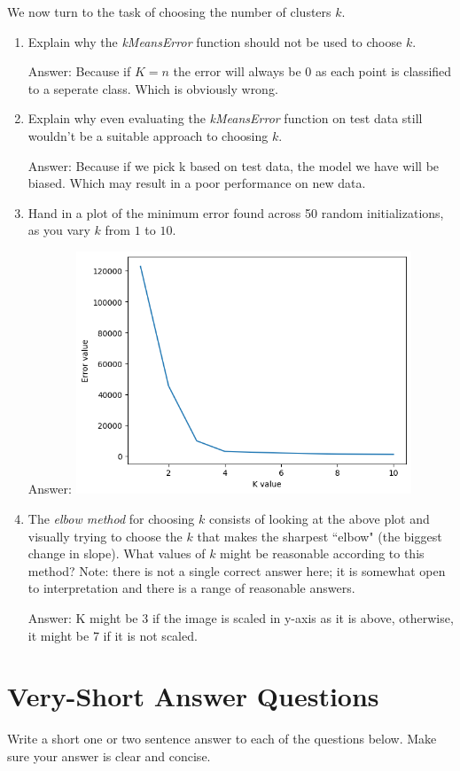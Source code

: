 \documentclass{article}
\def\ans#1{\par\gre{Answer: #1}}
\def\blu#1{{\color{blu}#1}}
\def\gre#1{{\color{gre}#1}}
\def\enum#1{\begin{enumerate}#1\end{enumerate}}
\begin{document}
 We now turn to the task of choosing the number of clusters $k$.
  
 \blu{\enum{
 \item Explain why the \emph{kMeansError} function should not be used to choose $k$. \ans{Because if $K = n$ the error will always be 0 as each point is classified to a seperate class. Which is obviously wrong.}
 \item Explain why even evaluating the \emph{kMeansError} function on test data still wouldn't be a suitable approach to choosing $k$. \ans{Because if we pick k based on test data, the model we have will be biased. Which may result in a poor performance on new data.}
 \item Hand in a plot of the minimum error found across 50 random initializations, as you vary $k$ from $1$ to $10$. \ans{\includegraphics[width=10cm]{KvsError.png}}
 \item The \emph{elbow method} for choosing $k$ consists of looking at the above plot and visually trying to choose the $k$ that makes the sharpest ``elbow" (the biggest change in slope). What values of $k$ might be reasonable according to this method? Note: there is not a single correct answer here; it is somewhat open to interpretation and there is a range of reasonable answers. \ans{K might be 3 if the image is scaled in y-axis as it is above, otherwise, it might be 7 if it is not scaled.}
 }}
 



\section{Very-Short Answer Questions}

\blu{Write a short one or two sentence answer to each of the questions below}. Make sure your answer is clear and concise.
\end{document}
